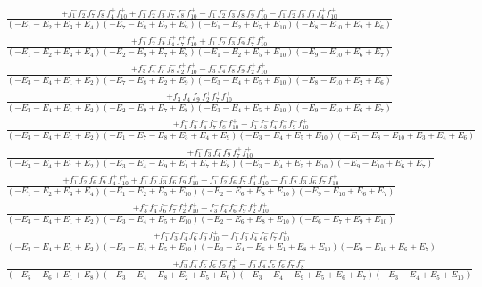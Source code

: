 \documentclass{article}
\begin{document}
\[\begin{array}{rcl}
\frac{+f_{1}^{-}f_{2}^{-}f_{7}^{-}f_{8}^{-}f_{4}^{+}f_{10}^{+}+f_{1}^{-}f_{2}^{-}f_{3}^{-}f_{7}^{-}f_{8}^{-}f_{10}^{+}-f_{1}^{-}f_{2}^{-}f_{3}^{-}f_{8}^{-}f_{9}^{-}f_{10}^{+}-f_{1}^{-}f_{2}^{-}f_{8}^{-}f_{9}^{-}f_{4}^{+}f_{10}^{+}}{(-E_{1}-E_{2}+E_{3}+E_{4})(-E_{7}-E_{8}+E_{2}+E_{9})(-E_{1}-E_{2}+E_{5}+E_{10})(-E_{8}-E_{10}+E_{2}+E_{6})}\\
\frac{+f_{1}^{-}f_{2}^{-}f_{9}^{-}f_{4}^{+}f_{7}^{+}f_{10}^{+}+f_{1}^{-}f_{2}^{-}f_{3}^{-}f_{9}^{-}f_{7}^{+}f_{10}^{+}}{(-E_{1}-E_{2}+E_{3}+E_{4})(-E_{2}-E_{9}+E_{7}+E_{8})(-E_{1}-E_{2}+E_{5}+E_{10})(-E_{9}-E_{10}+E_{6}+E_{7})}\\
\frac{+f_{3}^{-}f_{4}^{-}f_{7}^{-}f_{8}^{-}f_{2}^{+}f_{10}^{+}-f_{3}^{-}f_{4}^{-}f_{8}^{-}f_{9}^{-}f_{2}^{+}f_{10}^{+}}{(-E_{3}-E_{4}+E_{1}+E_{2})(-E_{7}-E_{8}+E_{2}+E_{9})(-E_{3}-E_{4}+E_{5}+E_{10})(-E_{8}-E_{10}+E_{2}+E_{6})}\\
\frac{+f_{3}^{-}f_{4}^{-}f_{9}^{-}f_{2}^{+}f_{7}^{+}f_{10}^{+}}{(-E_{3}-E_{4}+E_{1}+E_{2})(-E_{2}-E_{9}+E_{7}+E_{8})(-E_{3}-E_{4}+E_{5}+E_{10})(-E_{9}-E_{10}+E_{6}+E_{7})}\\
\frac{+f_{1}^{-}f_{3}^{-}f_{4}^{-}f_{7}^{-}f_{8}^{-}f_{10}^{+}-f_{1}^{-}f_{3}^{-}f_{4}^{-}f_{8}^{-}f_{9}^{-}f_{10}^{+}}{(-E_{3}-E_{4}+E_{1}+E_{2})(-E_{1}-E_{7}-E_{8}+E_{3}+E_{4}+E_{9})(-E_{3}-E_{4}+E_{5}+E_{10})(-E_{1}-E_{8}-E_{10}+E_{3}+E_{4}+E_{6})}\\
\frac{+f_{1}^{-}f_{3}^{-}f_{4}^{-}f_{9}^{-}f_{7}^{+}f_{10}^{+}}{(-E_{3}-E_{4}+E_{1}+E_{2})(-E_{3}-E_{4}-E_{9}+E_{1}+E_{7}+E_{8})(-E_{3}-E_{4}+E_{5}+E_{10})(-E_{9}-E_{10}+E_{6}+E_{7})}\\
\frac{+f_{1}^{-}f_{2}^{-}f_{6}^{-}f_{9}^{-}f_{4}^{+}f_{10}^{+}+f_{1}^{-}f_{2}^{-}f_{3}^{-}f_{6}^{-}f_{9}^{-}f_{10}^{+}-f_{1}^{-}f_{2}^{-}f_{6}^{-}f_{7}^{-}f_{4}^{+}f_{10}^{+}-f_{1}^{-}f_{2}^{-}f_{3}^{-}f_{6}^{-}f_{7}^{-}f_{10}^{+}}{(-E_{1}-E_{2}+E_{3}+E_{4})(-E_{1}-E_{2}+E_{5}+E_{10})(-E_{2}-E_{6}+E_{8}+E_{10})(-E_{9}-E_{10}+E_{6}+E_{7})}\\
\frac{+f_{3}^{-}f_{4}^{-}f_{6}^{-}f_{7}^{-}f_{2}^{+}f_{10}^{+}-f_{3}^{-}f_{4}^{-}f_{6}^{-}f_{9}^{-}f_{2}^{+}f_{10}^{+}}{(-E_{3}-E_{4}+E_{1}+E_{2})(-E_{3}-E_{4}+E_{5}+E_{10})(-E_{2}-E_{6}+E_{8}+E_{10})(-E_{6}-E_{7}+E_{9}+E_{10})}\\
\frac{+f_{1}^{-}f_{3}^{-}f_{4}^{-}f_{6}^{-}f_{9}^{-}f_{10}^{+}-f_{1}^{-}f_{3}^{-}f_{4}^{-}f_{6}^{-}f_{7}^{-}f_{10}^{+}}{(-E_{3}-E_{4}+E_{1}+E_{2})(-E_{3}-E_{4}+E_{5}+E_{10})(-E_{3}-E_{4}-E_{6}+E_{1}+E_{8}+E_{10})(-E_{9}-E_{10}+E_{6}+E_{7})}\\
\frac{+f_{3}^{-}f_{4}^{-}f_{5}^{-}f_{6}^{-}f_{9}^{-}f_{8}^{+}-f_{3}^{-}f_{4}^{-}f_{5}^{-}f_{6}^{-}f_{7}^{-}f_{8}^{+}}{(-E_{5}-E_{6}+E_{1}+E_{8})(-E_{3}-E_{4}-E_{8}+E_{2}+E_{5}+E_{6})(-E_{3}-E_{4}-E_{9}+E_{5}+E_{6}+E_{7})(-E_{3}-E_{4}+E_{5}+E_{10})}\\

\end{array}\]
\end{document}
